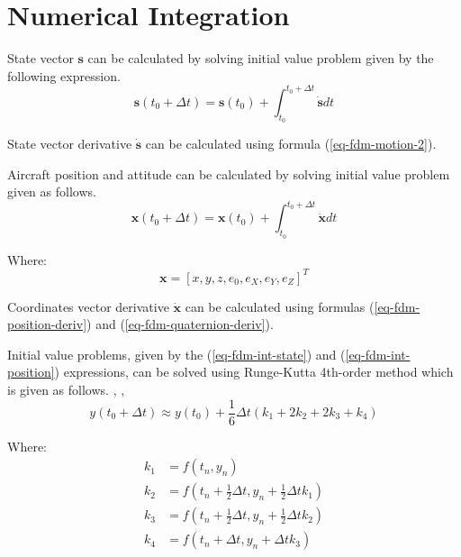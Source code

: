 \section{Numerical Integration}

State vector $\boldsymbol s$ can be calculated by solving initial value problem given by the following expression.
\begin{equation}
  \label{eq-fdm-int-state}
  {\boldsymbol s} \left( t_0 + \Delta t \right)
  =
  {\boldsymbol s} \left( t_0 \right)
  +
  \int_{t_0}^{t_0 + \Delta t} \dot {\boldsymbol s} dt
\end{equation}


State vector derivative $\dot {\boldsymbol s}$ can be calculated using formula (\ref{eq-fdm-motion-2}).

Aircraft position and attitude can be calculated by solving initial value problem given as follows.
\begin{equation}
  \label{eq-fdm-int-position}
  {\boldsymbol x} \left( t_0 + \Delta t \right)
  =
  {\boldsymbol x} \left( t_0 \right)
  +
  \int_{t_0}^{t_0 + \Delta t} \dot {\boldsymbol x} dt
\end{equation}

Where:
\begin{equation}
  {\boldsymbol x}
  =
  \left[
    x, y, z, e_0, e_X, e_Y, e_Z
  \right]^T
\end{equation}

Coordinates vector derivative $\dot {\boldsymbol x}$ can be calculated using formulas (\ref{eq-fdm-position-deriv}) and (\ref{eq-fdm-quaternion-deriv}).

Initial value problems, given by the (\ref{eq-fdm-int-state}) and (\ref{eq-fdm-int-position}) expressions, can be solved using Runge-Kutta 4th-order method which is given as follows. \cite{Press2007}, \cite{Krupowicz1986}, \cite{BaronPiatek2004}
\begin{equation}
  y \left( t_0 + \Delta t \right)
  \approx
  y \left( t_0 \right)
  +
  \frac{1}{6} \Delta t \left( k_1 + 2 k_2 + 2 k_3 + k_4 \right)
\end{equation}

Where:
\begin{align}
  k_1 &=
  f \left( t_n, y_n \right) \\
  k_2 &=
  f \left( t_n + \frac{1}{2} \Delta t, y_n + \frac{1}{2} \Delta t k_1 \right) \\
  k_3 &= 
  f \left( t_n + \frac{1}{2} \Delta t, y_n + \frac{1}{2} \Delta t k_2 \right) \\
  k_4 &= 
  f \left( t_n + \Delta t, y_n + \Delta t k_3 \right) \\
\end{align}
